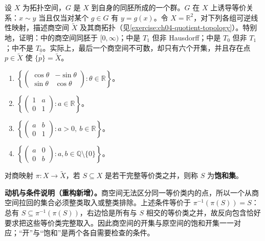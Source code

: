 \documentclass[../../main.tex]{subfiles}%
\begin{document}
\begin{exercise}\label{exercise:ch04-quotient-maps}
设 $X$ 为拓扑空间，$G$ 是 $X$ 到自身的同胚所成的一个群。$G$ 在 $X$ 上诱导等价关系：$x\sim y$ 当且仅当对某个 $g\in G$ 有 $y=g(x)$。令 $X=\mathbb R^2$，对下列各组可逆线性映射，描述商空间 $\widetilde X$ 及其商拓扑（见\cref{exercise:ch04-quotient-topology}）。特别地，证明：中的商空间同胚于 $[0,\infty)$；中是 $T_1$ 但非 Hausdorff；中是 $T_0$ 但非 $T_1$；中不是 $T_0$。实际上，最后一个商空间不可数，却只有六个开集，并且存在点 $p\in\widetilde X$ 使 $\overline{\{p\}}=\widetilde X$。
\begin{enumerate}
\item\label{item:ch04-quotient-rotations} $\left\{\begin{pmatrix}\cos\theta&-\sin\theta\\\sin\theta&\cos\theta\end{pmatrix}:\theta\in\mathbb R\right\}$。
\item\label{item:ch04-quotient-shears} $\left\{\begin{pmatrix}1&a\\0&1\end{pmatrix}:a\in\mathbb R\right\}$。
\item\label{item:ch04-quotient-affine} $\left\{\begin{pmatrix}a&b\\0&1\end{pmatrix}:a>0,\ b\in\mathbb R\right\}$。
\item\label{item:ch04-quotient-rational} $\left\{\begin{pmatrix}a&0\\0&b\end{pmatrix}:a,b\in\mathbb Q\setminus\{0\}\right\}$。
\end{enumerate}
\end{exercise}
\begin{definition*}\label{definition:ch04-saturated-set}
对商映射 $\pi:X\to\widetilde X$，若 $S\subseteq X$ 是若干完整等价类之并，则称 $S$ 为\textbf{饱和集}。
\end{definition*}
\begin{remark}
\textbf{动机与条件说明（重构新增）。}商空间无法区分同一等价类内的点，所以一个从商空间拉回的集合必须整类取入或整类排除。上述条件等价于 $\pi^{-1}(\pi(S))=S$：总有 $S\subseteq\pi^{-1}(\pi(S))$，右边恰是所有与 $S$ 相交的等价类之并，故反向包含恰好要求把这些等价类完整取入。因此商空间的开集与原空间的饱和开集一一对应；“开”与“饱和”是两个各自需要检查的条件。
\end{remark}
\end{document}
